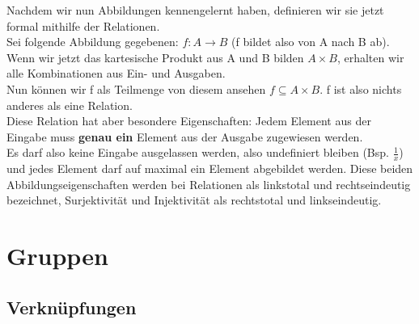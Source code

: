 \documentclass[parskip=full]{scrartcl}
\begin{document}
        Nachdem wir nun Abbildungen kennengelernt haben, definieren wir sie jetzt formal mithilfe der Relationen.
        \\Sei folgende Abbildung gegebenen: \(f: A \to B\) (f bildet also von A nach B ab).
        \\Wenn wir jetzt das kartesische Produkt aus A und B bilden \(A \times B\), erhalten wir alle Kombinationen aus Ein- und Ausgaben.
        \\Nun können wir f als Teilmenge von diesem ansehen \(f \subseteq A \times B\).
        f ist also nichts anderes als eine Relation.
        \\Diese Relation hat aber besondere Eigenschaften: 
        Jedem Element aus der Eingabe muss \textbf{genau ein} Element aus der Ausgabe zugewiesen werden.
        \\Es darf also keine Eingabe ausgelassen werden, also undefiniert bleiben (Bsp. \(\frac{1}{x}\)) 
        und jedes Element darf auf maximal ein Element abgebildet werden. 
        Diese beiden Abbildungseigenschaften werden bei Relationen als linkstotal und rechtseindeutig bezeichnet, 
        Surjektivität und Injektivität als rechtstotal und linkseindeutig.

\section{Gruppen}
    \subsection{Verknüpfungen}
\end{document}
